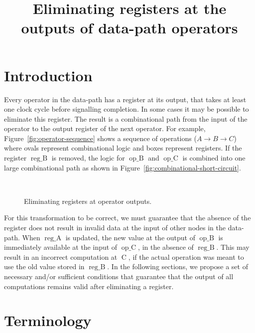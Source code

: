 \documentclass[a4paper,12pt]{article}
\title{Eliminating registers at the outputs of data-path operators}
\date{}
\newcommand{\SYM}[1]{$\operatorname{#1}$}
\begin{document}
\maketitle

\section{Introduction}

Every operator in the data-path has a register at its output, that
takes at least one clock cycle before signalling completion. In some
cases it may be possible to eliminate this register. The result is a
combinational path from the input of the operator to the output
register of the next operator. For example,
Figure~\ref{fig:operator-sequence} shows a sequence of operations
($A\longrightarrow B\longrightarrow C$) where ovals represent
combinational logic and boxes represent registers. If the register
\SYM{reg\_B} is removed, the logic for \SYM{op\_B} and \SYM{op\_C} is
combined into one large combinational path as shown in
Figure~\ref{fig:combinational-short-circuit}.

\begin{figure}[htb]
  \centering
  \\
  \vspace{0.25in}
  \caption{Eliminating registers at operator outputs.}
  \label{fig:register-elimination}
\end{figure}
  
For this transformation to be correct, we must guarantee that the
absence of the register does not result in invalid data at the input
of other nodes in the data-path. When  \SYM{reg\_A} is updated,
the new value at the output of \SYM{op\_B} is immediately available at
the input of \SYM{op\_C}, in the absence of  \SYM{reg\_B}. This
may result in an incorrect computation at \SYM{C}, if the actual
operation was meant to use the old value stored in \SYM{reg\_B}. In
the following sections, we propose a set of necessary and/or
sufficient conditions that guarantee that the output of all
computations remains valid after eliminating a register.

\section{Terminology}
\label{sec:terminology}
\end{document}
